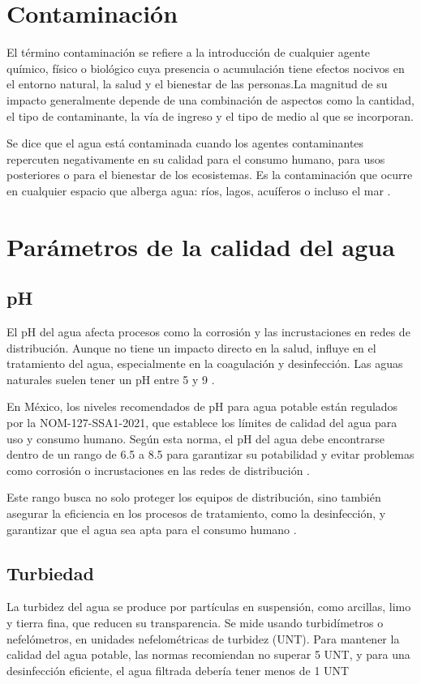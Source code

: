 \section{Contaminación}
El término contaminación se refiere a la introducción de cualquier agente químico, físico o biológico cuya presencia o acumulación tiene efectos nocivos en el entorno natural,  la salud y el bienestar de las personas.La magnitud de su impacto generalmente depende de una combinación de aspectos como la cantidad, el tipo de contaminante, la vía de ingreso  y el tipo de medio al que se incorporan.

Se dice que el agua está contaminada cuando los agentes contaminantes repercuten negativamente en su calidad para el consumo humano, para usos posteriores o para el bienestar de los ecosistemas. Es la contaminación que ocurre en cualquier espacio que alberga agua: ríos, lagos, acuíferos o incluso el mar \cite{agua2024contaminacion}. 


\section{Parámetros de la calidad del agua}

\subsection{pH}
El pH del agua afecta procesos como la corrosión y las incrustaciones en redes de distribución. Aunque no tiene un impacto directo en la salud, influye en el tratamiento del agua, especialmente en la coagulación y desinfección. Las aguas naturales suelen tener un pH entre 5 y 9 \cite{uno2020}. 


En México, los niveles recomendados de pH para agua potable están regulados por la NOM-127-SSA1-2021, que establece los límites de calidad del agua para uso y consumo humano. Según esta norma, el pH del agua debe encontrarse dentro de un rango de 6.5 a 8.5 para garantizar su potabilidad y evitar problemas como corrosión o incrustaciones en las redes de distribución \cite{uno2020}.

Este rango busca no solo proteger los equipos de distribución, sino también asegurar la eficiencia en los procesos de tratamiento, como la desinfección, y garantizar que el agua sea apta para el consumo humano \cite{uno2020}.

\subsection{Turbiedad}
La turbidez del agua se produce por partículas en suspensión, como arcillas, limo y tierra fina, que reducen su transparencia. Se mide usando turbidímetros o nefelómetros, en unidades nefelométricas de turbidez (UNT). Para mantener la calidad del agua potable, las normas recomiendan no superar 5 UNT, y para una desinfección eficiente, el agua filtrada debería tener menos de 1 UNT\cite{uno2020}

